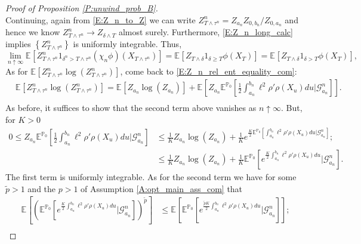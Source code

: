 \documentclass[11pt, letterpaper]{amsart}
\theoremstyle{definition}
\theoremstyle{remark}
\numberwithin{equation}{section}
\newcommand{\prob}{\mathbb{P}}
\newcommand{\esp}{\mathbb{E}}
\newcommand{\espalt}[2]{\esp^{#1}\bra{#2}}
\newcommand{\G}{\mathcal{G}}
\newcommand{\condespalt}[3]{\esp^{#1}\bra{#2\big| #3}}
\newcommand{\bra}[1]{\left[#1\right]}
\newcommand{\cbra}[1]{\left\{#1\right\}}
\begin{document}
\begin{proof}[Proof of Proposition \ref{P:unwind_prob_B}]
\begin{equation}
\end{equation}
Continuing, again from \eqref{E:Z_n_to_Z} we can write $Z^n_{T\wedge\tau^n} = Z_{a_n}Z_{0,b_n}/Z_{0,a_n}$ and hence we know $Z^n_{T\wedge\tau^n}\rightarrow Z_{\delta\wedge T}$ almost surely.  Furthermore, \eqref{E:Z_n_long_calc} implies $\cbra{Z^n_{T\wedge\tau^n}}$ is uniformly integrable. Thus,
\begin{equation*}
\lim_{n\uparrow\infty}\espalt{}{Z^n_{T\wedge\tau^n}1_{\delta^n>T\wedge\tau^n}(\chi_n\phi)(X_{T\wedge\tau^n})} = \espalt{}{Z_{T\wedge\delta}1_{\delta \geq  T}\phi(X_{T})} = \espalt{}{Z_{T\wedge\delta}1_{\delta >  T}\phi(X_{T})},
\end{equation*}
As for $\espalt{}{Z^n_{T\wedge\tau^n}\log\left(Z^n_{T\wedge\tau^n}\right)}$, come back to \eqref{E:Z_n_rel_ent_equality_com}:
\begin{equation*}
\begin{split}
&\espalt{}{Z^n_{T\wedge\tau^n}\log\left(Z^n_{T\wedge\tau^n}\right)} = \espalt{}{Z_{a_n}\log\left(Z_{a_n}\right)} + \espalt{}{Z_{a_n}\condespalt{\prob_0}{\frac{1}{2}\int_{a_n}^{b_n} \ell^2\rho'\rho(X_u)du}{\G^n_{a_n}}}.\\
\end{split}
\end{equation*}
As before, it suffices to show that the second term above vanishes as $n\uparrow\infty$. But, for $K>0$
\begin{equation*}
\begin{split}
0 \leq Z_{a_n}\condespalt{\prob_0}{\frac{1}{2}\int_{a_n}^{b_n} \ell^2\rho'\rho(X_u)du}{\G^n_{a_n}} &\leq \frac{1}{K} Z_{a_n}\log\left(Z_{a_n}\right) + \frac{1}{K}e^{\frac{K}{2}\condespalt{\prob_0}{\int_{a_n}^{b_n} \ell^2\rho'\rho(X_u)du}{\G^n_{a_n}}};\\
&\leq \frac{1}{K} Z_{a_n}\log\left(Z_{a_n}\right) + \frac{1}{K} \condespalt{\prob_0}{e^{\frac{K}{2}\int_{a_n}^{b_n} \ell^2\rho'\rho(X_u)du}}{\G^n_{a_n}}.
\end{split}
\end{equation*}
The first term is uniformly integrable.  As for the second term we have for some $\tilde{p}>1$ and the $p>1$ of Assumption \ref{A:opt_main_ass_com} that
\begin{equation*}
\begin{split}
\espalt{}{\left(\condespalt{\prob_0}{e^{\frac{K}{2}\int_{a_n}^{b_n} \ell^2\rho'\rho(X_u)du}}{\G^n_{a_n}}\right)^{\tilde{p}}} & \leq \espalt{}{\condespalt{\prob_0}{e^{\frac{\tilde{p}K}{2}\int_{a_n}^{b_n} \ell^2\rho'\rho(X_u)du}}{\G^n_{a_n}}};\\

\end{split}
\end{equation*}
\end{proof}
\end{document}
